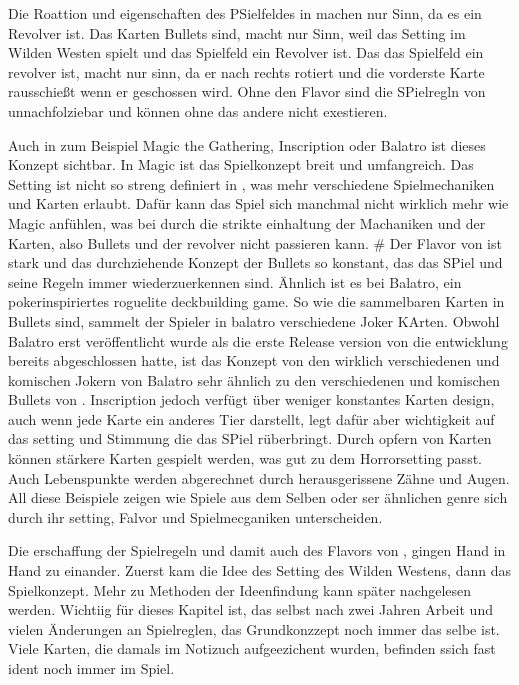 Die Roattion und eigenschaften des PSielfeldes in \FF machen nur Sinn, da es ein Revolver ist.
Das Karten Bullets sind, macht nur Sinn, weil das Setting im Wilden Westen spielt und das Spielfeld ein Revolver ist.
Das das Spielfeld ein revolver ist, macht nur sinn, da er nach rechts rotiert und die vorderste Karte rausschießt wenn er geschossen wird.
Ohne den Flavor sind die SPielregln von \FF unnachfolziebar und können ohne das andere nicht exestieren.


Auch in zum Beispiel Magic the Gathering, Inscription oder Balatro ist dieses Konzept sichtbar. In Magic ist das Spielkonzept breit und umfangreich. Das Setting ist nicht so streng definiert in \FF, was mehr verschiedene Spielmechaniken und Karten erlaubt. Dafür kann das Spiel sich manchmal nicht wirklich mehr wie Magic anfühlen,
was bei \FF durch die strikte einhaltung der Machaniken und der Karten, also  Bullets und der revolver nicht passieren kann. #
Der Flavor von \FF ist stark und das durchziehende Konzept der Bullets so konstant, das das SPiel und seine Regeln immer
wiederzuerkennen sind. Ähnlich ist es bei Balatro, ein pokerinspiriertes roguelite deckbuilding game.
So wie die sammelbaren Karten in \FF Bullets sind, sammelt der Spieler in balatro verschiedene Joker KArten.
Obwohl Balatro erst veröffentlicht wurde als die erste Release version von \FF die entwicklung bereits abgeschlossen hatte,
ist das Konzept von den wirklich verschiedenen und komischen Jokern von Balatro sehr ähnlich zu den verschiedenen und
komischen Bullets von \FF.
Inscription jedoch verfügt über weniger konstantes Karten design, auch wenn jede Karte ein anderes Tier darstellt,
legt dafür aber wichtigkeit auf das setting und Stimmung die das SPiel rüberbringt. Durch opfern von Karten können stärkere Karten
gespielt werden, was gut zu dem Horrorsetting passt. Auch Lebenspunkte werden abgerechnet durch herausgerissene Zähne und Augen.
All diese Beispiele zeigen wie Spiele aus dem Selben oder ser ähnlichen genre sich durch ihr setting, Falvor und Spielmecganiken unterscheiden.


Die erschaffung der Spielregeln und damit auch des Flavors von \FF, gingen Hand in Hand zu einander.
Zuerst kam die Idee des Setting des Wilden Westens, dann das Spielkonzept.
Mehr zu Methoden der Ideenfindung kann später nachgelesen werden. Wichtiig für dieses Kapitel ist,
das selbst nach zwei Jahren Arbeit und vielen Änderungen an Spielreglen, das Grundkonzzept noch immer das selbe ist.
Viele Karten, die damals im Notizuch aufgeezichent wurden, befinden ssich fast ident noch immer im Spiel.




